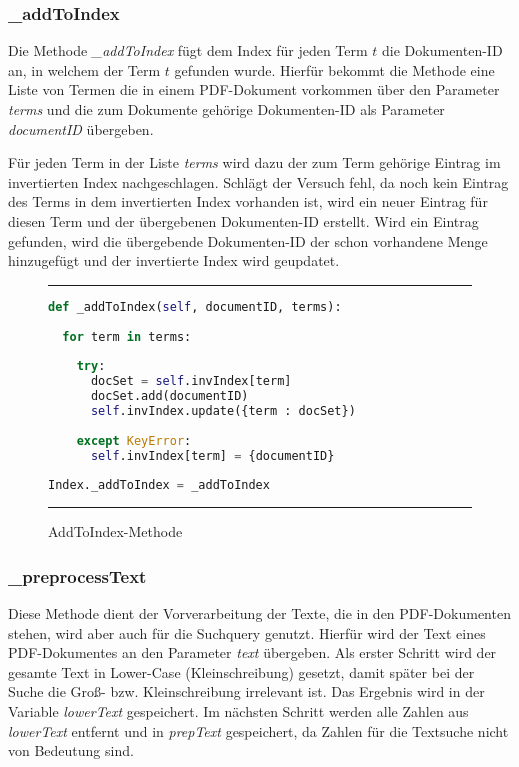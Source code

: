 \subsubsection{\_addToIndex}\label{addtoindex}

Die Methode \textit{\_addToIndex} fügt dem Index für jeden Term $t$ die Dokumenten-ID an, in welchem der Term $t$ gefunden wurde.  Hierfür bekommt die Methode eine Liste von Termen die in einem PDF-Dokument vorkommen über den Parameter \textit{terms} und die zum Dokumente gehörige Dokumenten-ID als Parameter \textit{documentID} übergeben.

Für jeden Term in der Liste \emph{terms} wird dazu der zum Term gehörige Eintrag im invertierten Index nachgeschlagen. Schlägt der Versuch fehl, da noch kein Eintrag des Terms in dem invertierten Index vorhanden ist, wird ein neuer Eintrag für diesen Term und der übergebenen Dokumenten-ID erstellt. Wird ein Eintrag gefunden, wird die übergebende Dokumenten-ID der schon vorhandene Menge hinzugefügt und der invertierte Index wird geupdatet.

\begin{figure}
	\rule{\textwidth}{0.4pt}
		\begin{lstlisting}[language=Python]
def _addToIndex(self, documentID, terms):
    
  for term in terms:
        
    try:
      docSet = self.invIndex[term]
      docSet.add(documentID)
      self.invIndex.update({term : docSet})
            
    except KeyError:
      self.invIndex[term] = {documentID}
    
Index._addToIndex = _addToIndex
		\end{lstlisting}
	\rule{\textwidth}{0.4pt}
	\caption{AddToIndex-Methode}
	\label{fig:addToIndex}
\end{figure}

\subsubsection{\_preprocessText}\label{preprocess}
Diese Methode dient der Vorverarbeitung der Texte, die in den PDF-Dokumenten stehen, wird aber auch für die Suchquery genutzt. Hierfür wird der Text eines PDF-Dokumentes an den Parameter \textit{text} übergeben. Als erster Schritt wird der gesamte Text in Lower-Case (Kleinschreibung) gesetzt, damit später bei der Suche die Groß- bzw. Kleinschreibung irrelevant ist. Das Ergebnis wird in der Variable \textit{lowerText} gespeichert. Im nächsten Schritt werden alle Zahlen aus \textit{lowerText} entfernt und in \textit{prepText} gespeichert, da Zahlen für die Textsuche nicht von Bedeutung sind.


